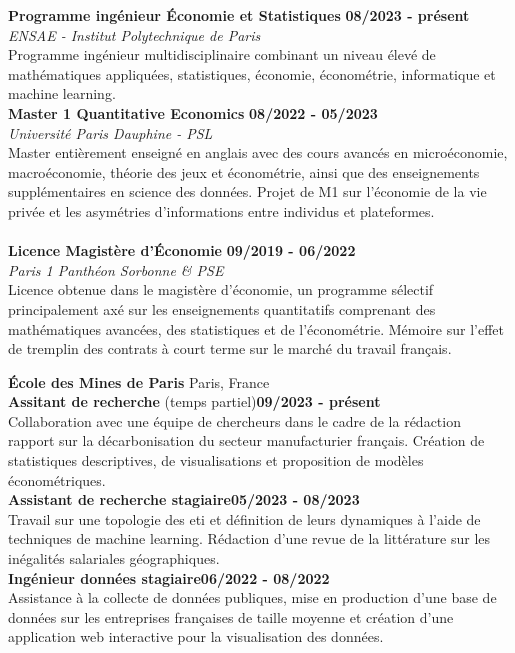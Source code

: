 \documentclass[11pt]{report}
\begin{document}
\begin{flushleft}
 \hrulefill
\end{flushleft}

	
\noindent\textbf{Programme ingénieur \textbar\space Économie et Statistiques}
\hfill
\textbf{08/2023 - présent} \\
\emph{ENSAE - Institut Polytechnique de Paris}\\
Programme ingénieur multidisciplinaire combinant un niveau élevé de mathématiques appliquées, statistiques,  économie, économétrie, informatique et machine learning. \\

\noindent\textbf{Master 1 \textbar\space Quantitative Economics}
\hfill
\textbf{08/2022 - 05/2023} \\
\emph{Université Paris Dauphine - PSL}\\
Master entièrement enseigné en anglais avec des cours avancés en microéconomie, macroéconomie, théorie des jeux et économétrie, ainsi que des enseignements supplémentaires en science des données. Projet de M1 sur l'économie de la vie privée et les asymétries d'informations entre individus et plateformes.\\
\\
\noindent\textbf{Licence \textbar\space Magistère d'Économie}
\hfill
\textbf{09/2019 - 06/2022} \\
\emph{Paris 1 Panthéon Sorbonne \& PSE}\\
Licence obtenue dans le magistère d'économie, un programme sélectif principalement axé sur les enseignements quantitatifs comprenant des mathématiques avancées, des statistiques et de l'économétrie. Mémoire sur l'effet de tremplin des contrats à court terme sur le marché du travail français.

	\begin{flushleft}
	 \hrulefill
	\end{flushleft}


\noindent\textbf{École des Mines de Paris} \hfill Paris, France\\[0.1cm]
\textbf{Assitant de recherche} (temps partiel)\hfill \textbf{09/2023 - présent} \\
Collaboration avec une équipe de chercheurs dans le cadre de la rédaction rapport sur la décarbonisation du secteur manufacturier français. Création de statistiques descriptives, de visualisations et proposition de modèles économétriques. \\[0.15cm]
\textbf{Assistant de recherche stagiaire}\hfill \textbf{05/2023 - 08/2023} \\
Travail sur une topologie des eti et définition de leurs dynamiques à l'aide de techniques de machine learning. Rédaction d'une revue de la littérature sur les inégalités salariales géographiques. \\[0.15cm]
\textbf{Ingénieur données stagiaire}\hfill \textbf{06/2022 - 08/2022} \\
Assistance à la collecte de données publiques, mise en production d'une base de données sur les entreprises françaises de taille moyenne et création d'une application web interactive pour la visualisation des données.\\
\end{document}
